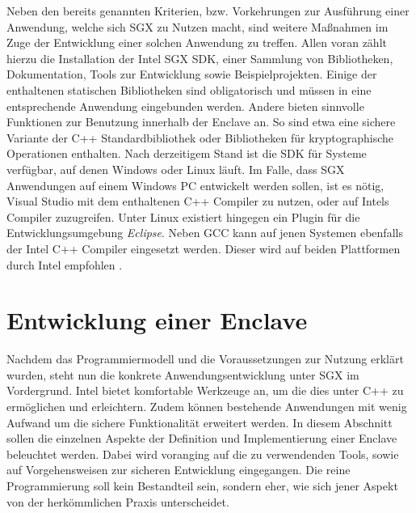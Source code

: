 Neben den bereits genannten Kriterien, bzw. Vorkehrungen zur Ausführung einer Anwendung, welche sich SGX zu Nutzen macht, sind weitere Maßnahmen im Zuge der Entwicklung einer solchen Anwendung zu treffen. Allen voran zählt hierzu die Installation der Intel SGX SDK, einer Sammlung von Bibliotheken, Dokumentation, Tools zur Entwicklung sowie Beispielprojekten. Einige der enthaltenen statischen Bibliotheken sind obligatorisch und müssen in eine entsprechende Anwendung eingebunden werden. Andere bieten sinnvolle Funktionen zur Benutzung innerhalb der Enclave an. So sind etwa eine sichere Variante der C++ Standardbibliothek oder Bibliotheken für kryptographische Operationen enthalten. Nach derzeitigem Stand ist die SDK für Systeme verfügbar, auf denen Windows oder Linux läuft. Im Falle, dass SGX Anwendungen auf einem Windows PC entwickelt werden sollen, ist es nötig, Visual Studio mit dem enthaltenen C++ Compiler zu nutzen, oder auf Intels Compiler zuzugreifen. Unter Linux existiert hingegen ein Plugin für die Entwicklungsumgebung \textit{Eclipse}. Neben GCC kann auf jenen Systemen ebenfalls der Intel C++ Compiler eingesetzt werden. Dieser wird auf beiden Plattformen durch Intel empfohlen \cite{WinDev}.

\section{Entwicklung einer Enclave}

Nachdem das Programmiermodell und die Voraussetzungen zur Nutzung erklärt wurden, steht nun die konkrete Anwendungsentwicklung unter SGX im Vordergrund. Intel bietet komfortable Werkzeuge an, um die dies unter C++ zu ermöglichen und erleichtern. Zudem können bestehende Anwendungen mit wenig Aufwand um die sichere Funktionalität erweitert werden. In diesem Abschnitt sollen die einzelnen Aspekte der Definition und Implementierung einer Enclave beleuchtet werden. Dabei wird voranging auf die zu verwendenden Tools, sowie auf Vorgehensweisen zur sicheren Entwicklung eingegangen. Die reine Programmierung soll kein Bestandteil sein, sondern eher, wie sich jener Aspekt von der herkömmlichen Praxis unterscheidet.

